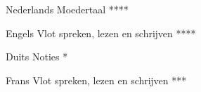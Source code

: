 




\begin{cvhonors}


\cvhonor
{Nederlands} %
{Moedertaal} %
{} %
{****} %


\cvhonor
{Engels} %
{Vlot spreken, lezen en schrĳven} %
{} %
{****} %


\cvhonor
{Duits} %
{Noties} %
{} %
{*} %



\cvhonor
{Frans} %
{Vlot spreken, lezen en schrĳven} %
{} %
{***} %


\end{cvhonors}